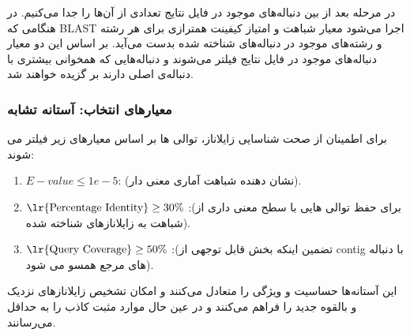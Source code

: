         در مرحله بعد از بین دنباله‌های موجود در فایل نتایج تعدادی از آن‌ها را جدا می‌کنیم. در هنگامی که BLAST اجرا می‌شود معیار شباهت و امتیاز کیفینت همترازی برای هر رشته و رشته‌های موجود در دنباله‌های شناخته شده بدست می‌آيد. بر اساس این دو معیار دنباله‌‌های موجود در فایل نتایج فیلتر می‌شوند و دنباله‌هایی که همخوانی بیشتری با دنباله‌ی اصلی دارند بر گزیده خواهند شد.
    \subsubsection*{معیارهای انتخاب: آستانه تشابه}
        برای اطمینان از صحت شناسایی زایلاناز، توالی ها بر اساس معیارهای زیر فیلتر می شوند:
        \begin{enumerate}
            \item $E-value \le 1e-5$: (نشان دهنده شباهت آماری معنی دار).
            \item $\text{\lr{Percentage Identity}} \ge 30\%$ :(برای حفظ توالی هایی با سطح معنی داری از شباهت به زایلانازهای شناخته شده).
            \item $\text{\lr{Query Coverage}} \ge 50\%$ :(تضمین اینکه بخش قابل توجهی از contig با دنباله های مرجع همسو می شود).
        \end{enumerate}
        این آستانه‌ها حساسیت و ویژگی را متعادل می‌کنند و امکان تشخیص زایلانازهای نزدیک و بالقوه جدید را فراهم می‌کنند و در عین حال موارد مثبت کاذب را به حداقل می‌رسانند.

